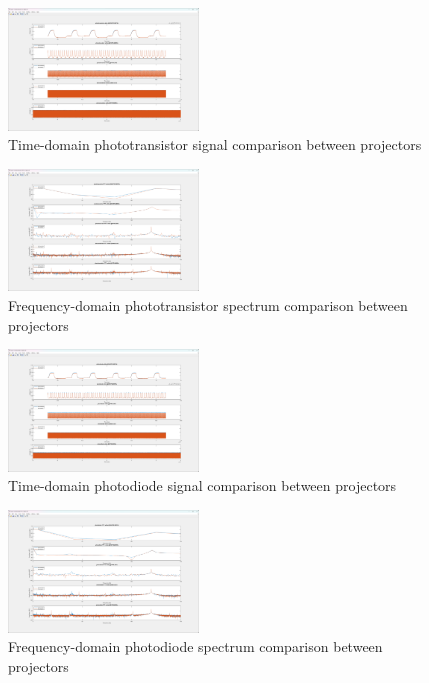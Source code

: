 \documentclass[conference]{IEEEtran}
\begin{document}
\begin{figure}[htbp]
	\centerline{\includegraphics[width=0.45\textwidth]{projector-phototransistor-time.png}}
	\caption{Time-domain phototransistor signal comparison between projectors}
	\label{fig:projector-phototransistor-time}
\end{figure}
\begin{figure}[htbp]
	\centerline{\includegraphics[width=0.45\textwidth]{projector-phototransistor-frequency.png}}
	\caption{Frequency-domain phototransistor spectrum comparison between projectors}
	\label{fig:projector-phototransistor-frequency}
\end{figure}
\begin{figure}[htbp]
	\centerline{\includegraphics[width=0.45\textwidth]{projector-photodiode-time.png}}
	\caption{Time-domain photodiode signal comparison between projectors}
	\label{fig:projector-photodiode-time}
\end{figure}
\begin{figure}[htbp]
	\centerline{\includegraphics[width=0.45\textwidth]{projector-photodiode-frequency.png}}
	\caption{Frequency-domain photodiode spectrum comparison between projectors}
	\label{fig:projector-photodiode-frequency}
\end{figure}
\end{document}
